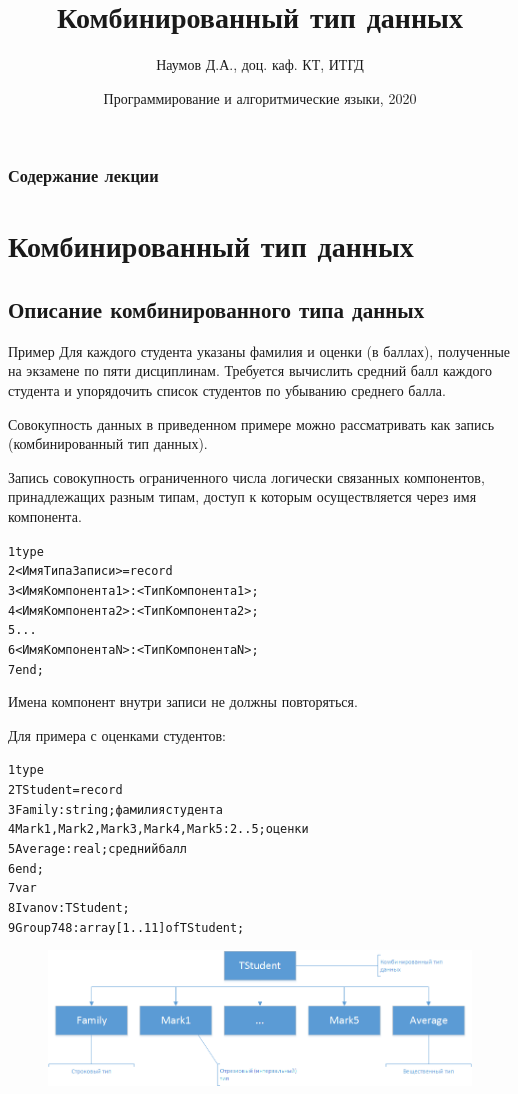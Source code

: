 \documentclass{beamer}
\title[Записи]{Комбинированный тип данных}
\author{Наумов Д.А., доц. каф. КТ, ИТГД }
\date[28.02.2020] {Программирование и алгоритмические языки, 2020}
\begin{document}
\begin{frame}
  \titlepage
\end{frame}
  
\begin{frame}
  \frametitle{Содержание лекции}
  \tableofcontents  
\end{frame}
  
\section{Комбинированный тип данных}
\subsection{Описание комбинированного типа данных}
\begin{frame}
\begin{block}{Пример}
Для каждого студента указаны фамилия и оценки (в баллах), полученные на экзамене по пяти 
дисциплинам. Требуется вычислить средний балл каждого студента и упорядочить список студентов
по убыванию среднего балла.	
\end{block}
Совокупность данных в приведенном примере можно рассматривать как запись (комбинированный тип данных).
\end{frame} 

\begin{frame}[fragile]
\begin{block}{Запись}
совокупность ограниченного числа логически связанных компонентов, принадлежащих разным типам, доступ к которым
осуществляется через имя компонента.	
\end{block}
\begin{alltt}
1 type
2   <ИмяТипаЗаписи> = record
3      <ИмяКомпонента1>: <ТипКомпонента1>;
4      <ИмяКомпонента2>: <ТипКомпонента2>;
5      ... 
6      <ИмяКомпонентаN>: <ТипКомпонентаN>;
7   end;
\end{alltt}
Имена компонент внутри записи не должны повторяться.
\end{frame}

\begin{frame}[fragile]
Для примера с оценками студентов:
\begin{alltt}
1 type
2   TStudent = record
3      Family: string; 							{фамилия студента}
4      Mark1, Mark2, Mark3, Mark4, Mark5:2..5; 	{оценки}
5      Average: real; 							{средний балл}
6   end;
7   var
8     Ivanov: TStudent;
9     Group748: array[1..11] of TStudent; 
\end{alltt}
\begin{figure}
\centering
\includegraphics[scale=0.4]{images/record-01.png}
\end{figure}
\end{frame}
\end{document}
